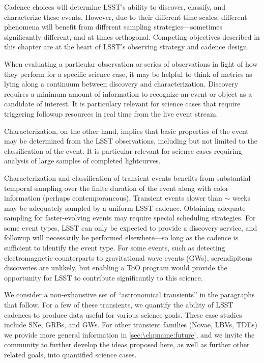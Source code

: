 Cadence choices will determine LSST's ability to discover, classify, and
characterize these events. However, due to their different time scales,
different phenomena will benefit from different sampling
strategies---sometimes
significantly different, and at times orthogonal.  Competing objectives
described in this chapter are at the heart of LSST's observing strategy and
cadence design.

When evaluating a particular observation or series of observations in
light of how they perform for a specific science case, it may be
helpful to think of metrics as lying along a continuum between
discovery and characterization. Discovery requires a minimum amount of
information to recognize an event or object as a candidate of
interest.  It is particulary relevant for science cases that require
triggering followup resources in real time from the live event stream.

Characterization, on the other hand, implies
that basic properties of the event may be determined from the
LSST observations, including but not limited to the classification of
the event.
It is particular relevant for science cases requiring analysis of large
samples of completed lightcurves.

Characterization and classification of transient events
benefits from substantial temporal sampling over the finite duration of the
event along with color information (perhaps contemporaneous).
Transient events slower than $\sim$ weeks may be adequately sampled by
a uniform LSST cadence.  Obtaining adequate sampling for faster-evolving
events may require special scheduling
strategies.  For some event types, LSST can only be expected to
provide a discovery service, and followup will necessarily be
performed elsewhere---so long as the cadence is sufficient to identify the
event type.
For some events, such as detecting electromagnetic counterparts to
gravitational wave events (GWs),
serendipitous discoveries are unlikely, but
enabling a ToO program would provide the opportunity for LSST to
contribute significantly to this science.


We consider a non-exhaustive set of ``astronomical transients'' in the
paragraphs that follow. For a few of these transients, we quantify the
ability of LSST cadences to produce data useful for various science
goals. These case studies include SNe, GRBs, and GWs. For other
transient families (Novae, LBVs, TDEs) we provide more general
information in \autoref{sec:\chpname:future}, and we invite the
community to further develop the ideas proposed here, as well as
further other related goals, into quantified science cases.

